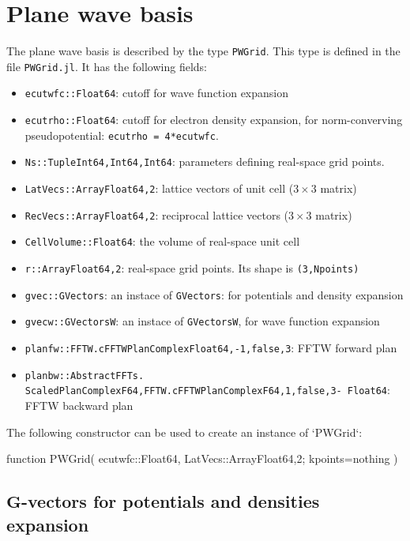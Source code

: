 \documentclass[a4paper,10pt,twocolumn]{paper}
\newcommand{\jlcode}[1]{\texttt{#1}}
\begin{document}
\section{Plane wave basis}

The plane wave basis is described by the type \jlcode{PWGrid}.
This type is defined in the file \jlcode{PWGrid.jl}. It has the following fields:
\begin{itemize}
%
\item \jlcode{ecutwfc::Float64}: cutoff for wave function expansion
%
\item \jlcode{ecutrho::Float64}: cutoff for electron density
  expansion, for norm-converving
  pseudopotential: \jlcode{ecutrho = 4*ecutwfc}.
%
\item \jlcode{Ns::Tuple{Int64,Int64,Int64}}: parameters defining real-space
grid points.
%
\item \jlcode{LatVecs::Array{Float64,2}}: lattice vectors of
unit cell ($3\times3$ matrix)
%
\item \jlcode{RecVecs::Array{Float64,2}}: reciprocal lattice
vectors ($3\times3$ matrix)
%
\item \jlcode{CellVolume::Float64}: the volume of real-space unit cell
%
\item \jlcode{r::Array{Float64,2}}: real-space grid points.
  Its shape is \jlcode{(3,Npoints)}
%
\item \jlcode{gvec::GVectors}: an instace of \jlcode{GVectors}:
  for potentials and density expansion
%
\item \jlcode{gvecw::GVectorsW}: an instace of \jlcode{GVectorsW},
for wave function expansion
%
\item \jlcode{planfw::FFTW.cFFTWPlan{Complex{Float64},-1,false,3}}: FFTW forward plan
%
\item \jlcode{planbw::AbstractFFTs.}\\
      \jlcode{ScaledPlan{ComplexF64,FFTW.cFFTWPlan{ComplexF64,1,false,3- Float64}}}: FFTW backward plan
%
\end{itemize}

The following constructor can be used to create an instance of `PWGrid`:

\begin{juliacode}
function PWGrid( ecutwfc::Float64,
                 LatVecs::Array{Float64,2};
                 kpoints=nothing )
\end{juliacode}


\subsection{$\mathbf{G}$-vectors for potentials and densities expansion}
\end{document}
